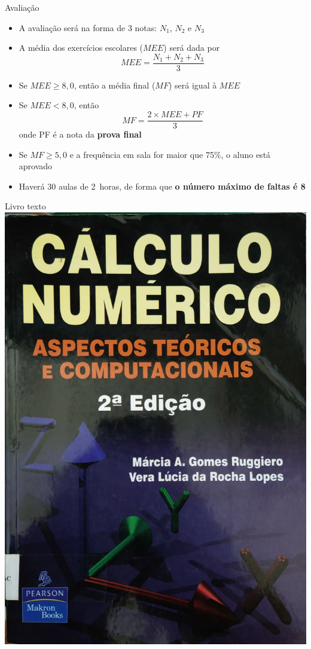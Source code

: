 \begin{frame}{Avaliação}
    \begin{itemize}
        \item A avaliação será na forma de 3 notas: \(N_1\), \(N_2\) e \(N_3\)
        \item A média dos exercícios escolares (\(MEE\)) será dada por
            \[
                MEE=\frac{N_1+N_2+N_3}{3}
            \]
        \item Se \(MEE \geq 8,0\), então a média final (\(MF\)) será igual à \(MEE\)
        \item Se \(MEE < 8,0\), então
            \[
                MF=\frac{2\times MEE+PF}{3}
            \]
            onde PF é a nota da \textbf{prova final}
        \item Se \(MF \geq 5,0\) e a frequência em sala for maior que 75\%, o aluno está aprovado
        \item Haverá 30 aulas de \SI{2}{horas}, de forma que \textbf{o número máximo de faltas é 8}
    \end{itemize}
\end{frame}

\begin{frame}{Livro texto}
    \centering
    \includegraphics[height=0.8\textheight]{images/ruggiero.png}
\end{frame}

